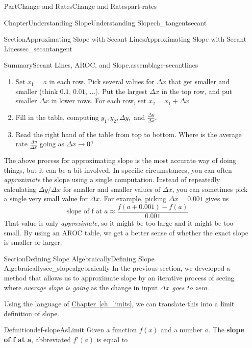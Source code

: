 \documentclass[oneside,10pt,]{tufte-book}
\newcommand{\xreffont}{\relax}
\newcommand{\terminology}[1]{\textbf{#1}}
\numberwithin{equation}{chapter}
\begin{document}
\begin{partptx}{Part}{Change and Rates}{}{Change and Rates}{}{}{part-rates}
\begin{chapterptx}{Chapter}{Understanding Slope}{}{Understanding Slope}{}{}{ch_tangentsecant}
\begin{sectionptx}{Section}{Approximating Slope with Secant Lines}{}{Approximating Slope with Secant Lines}{}{}{sec_secantangent}
\begin{assemblage}{Summary}{Secant Lines, AROC, and Slope.}{assemblage-secantlines}
\begin{itemize}[label=\textbullet]
\begin{enumerate}
\item{}Set \(x_1=a\) in each row. Pick several values for \(\Delta x\) that get smaller and smaller (think \(0.1\), \(0.01\), \(\dots\)). Put the largest \(\Delta x\) in the top row, and put smaller \(\Delta x \) in lower rows. For each row, set \(x_2 = x_1 + \Delta x\)%
\item{}Fill in the table, computing \(y_1,y_2,\Delta y,\) and \(\frac{\Delta y}{\Delta x}\).%
\item{}Read the right hand of the table from top to bottom.  Where is the average rate \(\frac{\Delta y}{\Delta x}\) going as \(\Delta x\rightarrow 0\)?%
\end{enumerate}
%
\end{itemize}
%
\end{assemblage}
The above process for approximating slope is the most accurate way of doing things, but it can be a bit involved. In specific circumstances, you can often \emph{approximate} the slope using a single computation.  Instead of repeatedly calculating \(\Delta y/\Delta x\) for smaller and smaller values of \(\Delta x\), you can sometimes pick a single very small value for \(\Delta x\). For example, picking \(\Delta x = 0.001\) gives us%
\begin{equation*}
\text{slope of f at }a \approx \dfrac{f(a+0.001) - f(a) }{0.001}
\end{equation*}
That value is only \emph{approximate}, so it might be too large and it might be too small. By using an AROC table, we get a better sense of whether the exact slope is smaller or larger.%
\end{sectionptx}
%
%
\typeout{************************************************}
\typeout{************************************************}
%
\begin{sectionptx}{Section}{Defining Slope Algebraically}{}{Defining Slope Algebraically}{}{}{sec_slopealgebraically}
In the previous section, we developed a method that allows us to approximate slope by an iterative process of seeing where \emph{average slope is going} as the change in input \emph{\(\Delta x\) goes to zero}.%
\par
Using the language of \hyperref[ch_limits]{Chapter~{\xreffont\ref{ch_limits}}}, we can translate this into a limit definition of slope.%
\begin{definition}{Definition}{}{def-slopeAsLimit}%
Given a function \(f(x)\) and a number \(a\). The \terminology{slope of f at a}, abbreviated \(f'(a)\) is equal to%

\end{definition}
\end{sectionptx}
\end{chapterptx}
\end{partptx}
\end{document}

